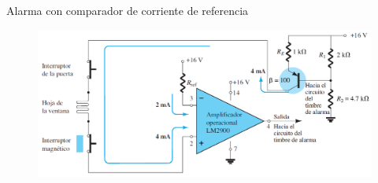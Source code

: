 \documentclass[t,aspectratio=169]{beamer}
\begin{document}
\begin{frame}{Alarma con comparador de corriente de referencia}

\begin{figure}[H]
    \centering
    \includegraphics[width=\textwidth]{figuras/aplicaciones_6_alarma_comparador.png}
\end{figure}

\end{frame}
\end{document}
